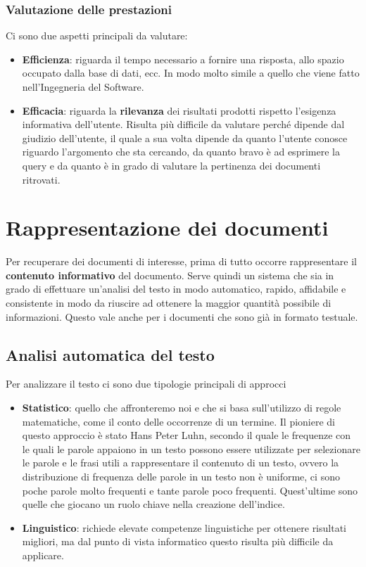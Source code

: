 \subsection{Valutazione delle prestazioni}

Ci sono due aspetti principali da valutare:

\begin{itemize}
	\item \textbf{Efficienza}: riguarda il tempo necessario a fornire una risposta, allo spazio occupato dalla base di dati, ecc. In modo molto simile a quello che viene fatto nell'Ingegneria del Software.
	\item \textbf{Efficacia}: riguarda la \textbf{rilevanza} dei risultati prodotti rispetto l'esigenza informativa dell'utente. Risulta più difficile da valutare perché dipende dal giudizio dell'utente, il quale a sua volta dipende da quanto l'utente conosce riguardo l'argomento che sta cercando, da quanto bravo è ad esprimere la query e da quanto è in grado di valutare la pertinenza dei documenti ritrovati.
\end{itemize}

\chapter{Rappresentazione dei documenti}

Per recuperare dei documenti di interesse, prima di tutto occorre rappresentare il \textbf{contenuto informativo} del documento.
Serve quindi un sistema che sia in grado di effettuare un'analisi del testo in modo automatico, rapido, affidabile e consistente in modo da riuscire ad ottenere la maggior quantità possibile di informazioni.
Questo vale anche per i documenti che sono già in formato testuale.

\section{Analisi automatica del testo}

Per analizzare il testo ci sono due tipologie principali di approcci

\begin{itemize}
	\item \textbf{Statistico}: quello che affronteremo noi e che si basa sull'utilizzo di regole matematiche, come il conto delle occorrenze di un termine. Il pioniere di questo approccio è stato Hans Peter Luhn, secondo il quale le frequenze con le quali le parole appaiono in un testo possono essere utilizzate per selezionare le parole e le frasi utili a rappresentare il contenuto di un testo, ovvero la distribuzione di frequenza delle parole in un testo non è uniforme, ci sono poche parole molto frequenti e tante parole poco frequenti. Quest'ultime sono quelle che giocano un ruolo chiave nella creazione dell'indice.
	\item \textbf{Linguistico}: richiede elevate competenze linguistiche per ottenere risultati migliori, ma dal punto di vista informatico questo risulta più difficile da applicare.
\end{itemize}
